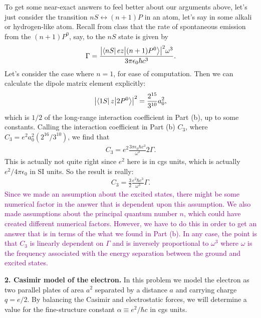 \documentclass{article}
\theoremstyle{definition}
\newcommand{\al}{\alpha}
\newcommand{\f}[2]{\frac{#1}{#2}}
\begin{document}
\begin{enumerate}[label=(\alph*)]
To get some near-exact answers to feel better about our arguments above, let's just consider the transition $nS \leftrightarrow (n+1)P$ in an atom, let's say in some alkali or hydrogen-like atom. Recall from class that the rate of spontaneous emission from the $(n+1)P^0$, say, to the $nS$ state is given by 
\begin{align*}
\Gamma = \f{\abs{\bra{nS} e z {\ket{(n+1)P^0}}}^2 \omega^3}{ 3\pi \epsilon_0 \hbar c^3}. 
\end{align*}
Let's consider the case where $n=1$, for ease of computation. Then we can calculate the dipole matrix element explicitly:
\begin{align*}
\abs{\bra{1S} z {\ket{2P^0}}}^2 = \f{2^{15}}{3^{10}} a_0^2,
\end{align*}
which is $1/2$ of the long-range interaction coefficient in Part (b), up to some constants. Calling the interaction coefficient in Part (b) $C_3$, where $C_3 = e^2 a_0^2 (2^{16} / 3^{10})$, we find that
\begin{align*}
C_3 = e^2 \f{3\pi \epsilon_0 \hbar c^3 }{\omega^3} 2\Gamma.
\end{align*}
This is actually not quite right since $e^2$ here is in cgs units, which is actually $e^2/4\pi\epsilon_0$ in SI units. So the result is really:
\begin{align*}
C_3 = \f{3}{2}  \f{e^2 \hbar c^3}{\omega^3} \Gamma.
\end{align*}
\textcolor{purple}{Since we made an assumption about the excited states, there might be some numerical factor in the answer that is dependent upon this assumption. We also made assumptions about the principal quantum number $n$, which could have created different numerical factors. However, we have to do this in order to get an answer that is in terms of the what we found in Part (b). In any case, the point is that $C_3$ is linearly dependent on $\Gamma$ and is inversely proportional to $\omega^3$ where $\omega$ is the frequency associated with the energy separation between the ground and excited states. }


\end{enumerate}





\noindent \textbf{2. Casimir model of the electron.} In this problem we model the electron as two parallel plates of area $a^2$ separated by a distance $a$ and carrying charge $q = e/2$. By balancing the Casimir and electrostatic forces, we will determine a value for the fine-structure constant $\al \equiv e^2/ \hbar c$ in cgs units.  \\
\end{document}
